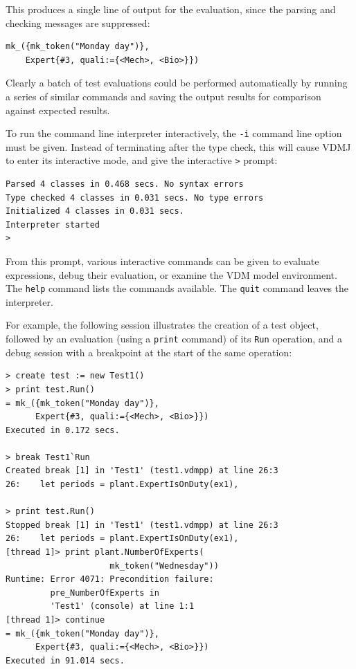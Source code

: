 \noindent This produces a single line of output for the evaluation, since the
parsing and checking messages are suppressed:

\begin{lstlisting}
mk_({mk_token("Monday day")},
	Expert{#3, quali:={<Mech>, <Bio>}})
\end{lstlisting}

Clearly a batch of test evaluations could be performed automatically by running
a series of similar commands and saving the output results for comparison
against expected results.

To run the command line interpreter interactively, the \verb|-i| command line
option must be given. Instead of terminating after the type check, this will
cause VDMJ to enter its interactive mode, and give the interactive \verb|>|
prompt:

\begin{lstlisting}
Parsed 4 classes in 0.468 secs. No syntax errors
Type checked 4 classes in 0.031 secs. No type errors
Initialized 4 classes in 0.031 secs. 
Interpreter started
>  
\end{lstlisting}

\noindent From this prompt, various interactive commands can be given to
evaluate expressions, debug their evaluation, or examine the VDM model environment.
The \verb|help| command lists the commands available. The \verb|quit| command
leaves the interpreter.

For example, the following session illustrates the creation of a test object,
followed by an evaluation (using a \texttt{print} command)
of its \verb|Run| operation, and a debug
session with a breakpoint at the start of the same operation:

\begin{lstlisting}
> create test := new Test1()
> print test.Run()
= mk_({mk_token("Monday day")}, 
      Expert{#3, quali:={<Mech>, <Bio>}})
Executed in 0.172 secs.

> break Test1`Run
Created break [1] in 'Test1' (test1.vdmpp) at line 26:3
26:    let periods = plant.ExpertIsOnDuty(ex1),

> print test.Run()
Stopped break [1] in 'Test1' (test1.vdmpp) at line 26:3
26:    let periods = plant.ExpertIsOnDuty(ex1),
[thread 1]> print plant.NumberOfExperts(
                     mk_token("Wednesday"))
Runtime: Error 4071: Precondition failure: 
         pre_NumberOfExperts in 
         'Test1' (console) at line 1:1
[thread 1]> continue
= mk_({mk_token("Monday day")}, 
      Expert{#3, quali:={<Mech>, <Bio>}})
Executed in 91.014 secs. 
\end{lstlisting}

